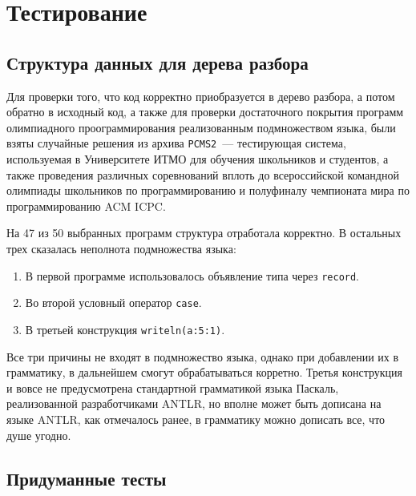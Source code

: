 \chapter{Тестирование}

\section{Структура данных для дерева разбора}
Для проверки того, что код корректно приобразуется в дерево разбора, а потом обратно в исходный код, а также
для проверки достаточного покрытия программ олимпиадного проограммирования реализованным подмножеством языка,
были взяты случайные решения из архива \texttt{PCMS2}~--- тестирующая система, используемая в Университете ИТМО
для обучения школьников и студентов, а также проведения различных соревнований вплоть до всероссийской командной
олимпиады школьников по программированию и полуфиналу чемпионата мира по программированию ACM ICPC.

На 47 из 50 выбранных программ структура отработала корректно. В остальных трех сказалась неполнота подмножества языка:
\begin{enumerate}
    \item В первой программе использовалось объявление типа через \texttt{record}.
    \item Во второй условный оператор \texttt{case}.
    \item В третьей конструкция \texttt{writeln(a:5:1)}.
\end{enumerate}
Все три причины не входят в подмножество языка, однако при добавлении их в грамматику, в дальнейшем смогут обрабатываться корретно.
Третья конструкция и вовсе не предусмотрена стандартной грамматикой языка Паскаль, реализованной разработчиками ANTLR, но вполне
может быть дописана на языке ANTLR, как отмечалось ранее, в грамматику можно дописать все, что душе угодно.

\section{Придуманные тесты}
